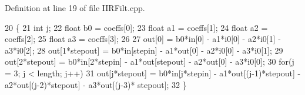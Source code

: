 Definition at line 19 of file I\+I\+R\+Filt.\+cpp.


\begin{DoxyCode}
20 \{
21     \textcolor{keywordtype}{int} j;
22     \textcolor{keywordtype}{float} b0 = coeffs[0];
23     \textcolor{keywordtype}{float} a1 = coeffs[1]; 
24     \textcolor{keywordtype}{float} a2 = coeffs[2];
25     \textcolor{keywordtype}{float} a3 = coeffs[3];
26 
27     out[0] = b0*in[0] - a1*i0[0] - a2*i0[1] - a3*i0[2];
28     out[1*stepout] = b0*in[stepin] - a1*out[0] - a2*i0[0] - a3*i0[1];
29     out[2*stepout] = b0*in[2*stepin] - a1*out[stepout] - a2*out[0] - a3*i0[0];
30     \textcolor{keywordflow}{for}(j = 3; j < length; j++)
31         out[j*stepout] = b0*in[j*stepin] - a1*out[(j-1)*stepout] - a2*out[(j-2)*stepout] - a3*out[(j-3)*
      stepout];
32 \}
\end{DoxyCode}
